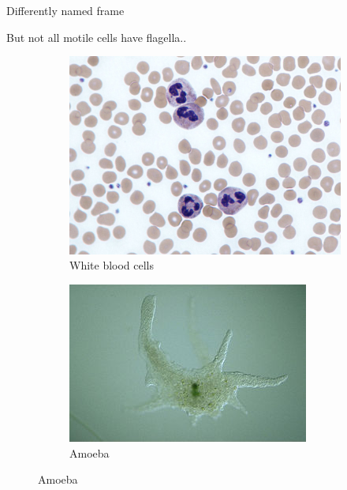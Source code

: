 \begin{frame}{Differently named frame}

  But not all motile cells have flagella..
  
  \begin{figure}
    
		\begin{subfigure}{0.4\textwidth}
			\includegraphics[width=\textwidth]{src/img/example1}
			\caption{White blood cells}
		\end{subfigure}
		\begin{subfigure}{0.44\textwidth}
			\includegraphics[width=\textwidth]{src/img/example2}
			\caption{Amoeba}
		\end{subfigure}
    
	\end{figure}

\end{frame}
